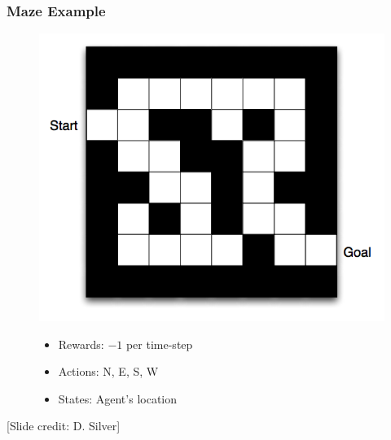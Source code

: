 \documentclass{beamer}
\begin{document}
\begin{frame}\frametitle{Maze Example}\small
\begin{figure}
\begin{minipage}{0.5\linewidth}
\includegraphics[width=\linewidth]{Figures/maze1}
\end{minipage}
\hspace{3mm}
\begin{minipage}{0.45\linewidth}
\begin{itemize}
\item Rewards:  $-1$ per time-step
\item Actions:  N, E, S, W
\item States:  Agent's location
\end{itemize}
\end{minipage}
\end{figure}

\vspace{12mm}
\scriptsize [Slide credit: D. Silver]
\end{frame}
\end{document}
